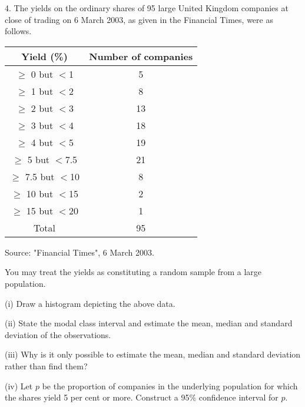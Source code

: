 \documentclass[a4paper,12pt]{article}
\begin{document}
\begin{framed} 
 
4. The yields on the ordinary shares of 95 large United Kingdom companies at close of trading on 6 March 2003, as given in the Financial Times, were as follows. 

\begin{center}
\begin{tabular}{|c|c|}
Yield (\%)  	&	Number of companies  	\\ \hline
			
$\geq$ 0 but $<$1 	&	5	\\ \hline
			
$\geq$ 1 but $<$2 	&	8	\\ \hline
			
$\geq$ 2 but $<$3 	&	13	\\ \hline
			
$\geq$ 3 but $<$4 	&	18	\\ \hline
			
$\geq$ 4 but $<$5  	&	19	\\ \hline
			
$\geq$ 5 but $<$7.5 	&	21	\\ \hline
			
$\geq$ 7.5 but $<$10 	&	8	\\ \hline
			
$\geq$ 10 but $<$15 	&	2	\\ \hline
			
$\geq$ 15 but $<$20 	&	1	\\ \hline
			
Total  	&	95	\\ \hline
\end{tabular}
\end{center}
 
           Source:  "Financial Times", 6 March 2003. 
 
You may treat the yields as constituting a random sample from a large population. 
 
(i) Draw a histogram depicting the above data. 

 
(ii) State the modal class interval and estimate the mean, median and standard deviation of the observations.
 
(iii) Why is it only possible to estimate the mean, median and standard deviation rather than find them? 
 
(iv) Let $p$ be the proportion of companies in the underlying population for which the shares yield 5 per cent or more.  Construct a 95\% confidence interval for $p$. 
 

\end{framed}
\end{document}
